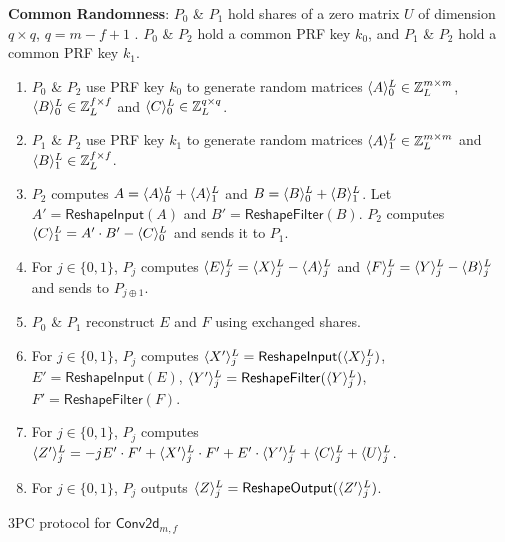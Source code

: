 \begin{algorithm}
\textbf{Common Randomness}: $P_0$ \& $P_1$ hold shares 
of a zero matrix $U$ of dimension $q \times q$, $q = m-f+1$ . $P_0$ \& $P_2$ hold a common PRF key $k_0$, and $P_1$ \& $P_2$ hold a common PRF key $k_1$.
\begin{enumerate}
\item $P_0$ \& $P_2$ use PRF key $k_0$ to generate random matrices 
$\langle A\rangle^{L}_{0} \in \mathbb{Z}_L^{m \times m}$, $\langle B\rangle^{L}_{0} \in \mathbb{Z}_L^{f \times f}$ and $\langle C\rangle^{L}_{0} \in \mathbb{Z}_L^{q\times q}$.
\item $P_1$ \& $P_2$ use PRF key $k_1$ to generate random matrices 
$\langle A\rangle^{L}_{1} \in \mathbb{Z}_L^{m \times m}$ and  $\langle B\rangle^{L}_{1} \in \mathbb{Z}_L^{f \times f}$.
\item $P_2$ computes $A = \langle A\rangle^{L}_{0} + \langle A\rangle^{L}_{1}$ and $B = \langle B\rangle^{L}_{0} + \langle B\rangle^{L}_{1}$. 
Let
$A' = \mathsf{ReshapeInput}(A)$ and $B' = \mathsf{ReshapeFilter}(B)$. $P_2$ computes $\langle C\rangle^{L}_{1} = A' \cdot B' - \langle C\rangle^{L}_{0}$ and sends it to $P_1$.
\item For $j \in \{0,1\}$, $P_j$ computes $\langle E\rangle^{L}_{j} = \langle X\rangle^{L}_{j} - \langle A\rangle^{L}_{j}$ and $\langle F\rangle^{L}_{j} = \langle Y\rangle^{L}_{j} - \langle B\rangle^{L}_{j}$ and sends to $P_{j\oplus 1}$.
\item $P_0$ \& $P_1$ reconstruct $E$ and $F$ using exchanged shares.
\item For $j \in \{0,1\}$, $P_j$ computes $\langle X'\rangle^{L}_{j} = \mathsf{ReshapeInput}(\langle X\rangle^{L}_{j})$, $E' = \mathsf{ReshapeInput}(E)$,  $\langle Y'\rangle^{L}_{j} = \mathsf{ReshapeFilter}(\langle Y\rangle^{L}_{j})$, $F' = \mathsf{ReshapeFilter}(F)$.
\item For $j \in \{0,1\}$, $P_j$ computes $\langle Z'\rangle^{L}_{j} = -jE' \cdot F' + \langle X'\rangle^{L}_{j} \cdot F' + E' \cdot \langle Y'\rangle^{L}_{j} + \langle C\rangle^{L}_{j} + \langle U\rangle^{L}_{j}$.
\item For $j \in \{0,1\}$, $P_j$ outputs $\langle Z\rangle^{L}_{j} = \mathsf{ReshapeOutput}(\langle Z'\rangle^{L}_{j})$.
\end{enumerate}
    \caption{{3PC protocol for $\mathsf{Conv2d}_{m,f}$ } \label{algo:conv2d}}

\end{algorithm}

